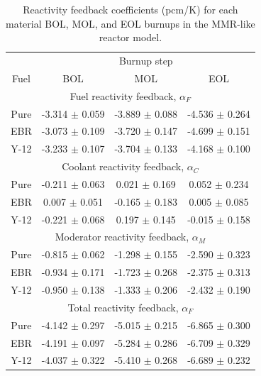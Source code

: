 \begin{table}[h!]
        \centering 
        \caption{Reactivity feedback coefficients (pcm/K) for each material 
        \gls*{BOL}, \gls*{MOL}, and \gls*{EOL} burnups in the \gls*{MMR}-like 
        reactor model.}
        \label{tab:coeff_mmr}
        \begin{tabular}{c c c c}
                \hline 
                & \multicolumn{3}{c}{Burnup step} \\
                Fuel & \gls*{BOL} & \gls*{MOL} & \gls*{EOL} \\
                \hline 
                \multicolumn{4}{c}{Fuel reactivity feedback, $\alpha_F$}\\
                Pure & -3.314 $\pm$ 0.059 & -3.889 $\pm$ 0.088 & -4.536 $\pm$ 0.264\\
                \gls*{EBR} & -3.073 $\pm$ 0.109 & -3.720 $\pm$ 0.147 & -4.699 $\pm$ 0.151\\
                Y-12 & -3.233 $\pm$ 0.107 & -3.704 $\pm$ 0.133 & -4.168 $\pm$ 0.100\\
                \multicolumn{4}{c}{Coolant reactivity feedback, $\alpha_C$}\\
                Pure & -0.211 $\pm$ 0.063 & 0.021 $\pm$ 0.169 & 0.052 $\pm$ 0.234\\
                \gls*{EBR} & 0.007 $\pm$ 0.051 & -0.165 $\pm$ 0.183 & 0.005 $\pm$ 0.085\\
                Y-12 & -0.221 $\pm$ 0.068 & 0.197 $\pm$ 0.145 & -0.015 $\pm$ 0.158\\
                \multicolumn{4}{c}{Moderator reactivity feedback, $\alpha_M$}\\
                Pure & -0.815 $\pm$ 0.062 & -1.298 $\pm$ 0.155 & -2.590 $\pm$ 0.323\\
                \gls*{EBR} &-0.934 $\pm$ 0.171 & -1.723 $\pm$ 0.268 & -2.375 $\pm$ 0.313\\
                Y-12 & -0.950 $\pm$ 0.138 & -1.333 $\pm$ 0.206 & -2.432 $\pm$ 0.190\\
                \multicolumn{4}{c}{Total reactivity feedback, $\alpha_F$}\\
                Pure & -4.142 $\pm$ 0.297 & -5.015 $\pm$ 0.215 & -6.865 $\pm$ 0.300\\
                \gls*{EBR} & -4.191 $\pm$ 0.097 & -5.284 $\pm$ 0.286 & -6.709 $\pm$ 0.329\\
                Y-12 & -4.037 $\pm$ 0.322 & -5.410 $\pm$ 0.268 & -6.689 $\pm$ 0.232\\
                \hline 
                
                
        \end{tabular}
\end{table}

